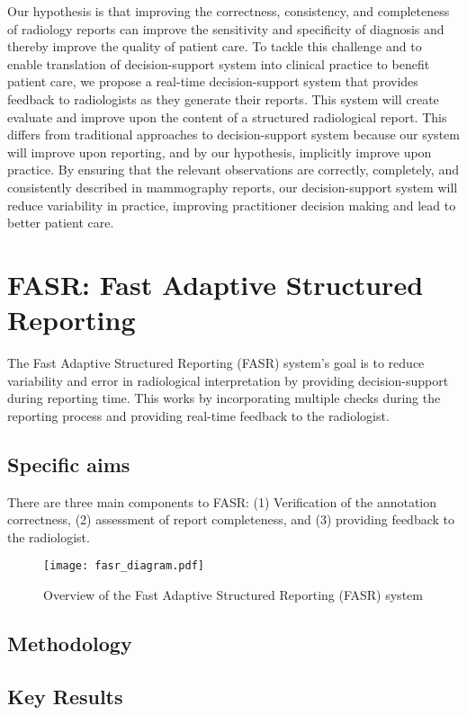 Our hypothesis is that improving the correctness, consistency, and completeness of radiology reports can improve the sensitivity and specificity of diagnosis and thereby improve the quality of patient care. To tackle this challenge and to enable translation of decision-support system into clinical practice to benefit patient care, we propose a real-time decision-support system that provides feedback to radiologists as they generate their reports. This system will create evaluate and improve upon the content of a structured radiological report. This differs from traditional approaches to decision-support system because our system will improve upon reporting, and by our hypothesis, implicitly improve upon practice. By ensuring that the relevant observations are correctly, completely, and consistently described in mammography reports, our decision-support system will reduce variability in practice, improving practitioner decision making and lead to better patient care.

\section{FASR: Fast Adaptive Structured Reporting}
The Fast Adaptive Structured Reporting (FASR) system's goal is to reduce variability and error in radiological interpretation by providing decision-support during reporting time. This works by incorporating multiple checks during the reporting process and providing real-time feedback to the radiologist.

\subsection{Specific aims}
There are three main components to FASR: (1) Verification of the annotation correctness, (2) assessment of report completeness, and (3) providing feedback to the radiologist.

\begin{figure}[h]
	\centering
	\texttt{[image: fasr\_diagram.pdf]}
	\caption{Overview of the Fast Adaptive Structured Reporting (FASR) system}
	\label{fig:fasr_diagram}
\end{figure}

\subsection{Methodology}

\subsection{Key Results}


